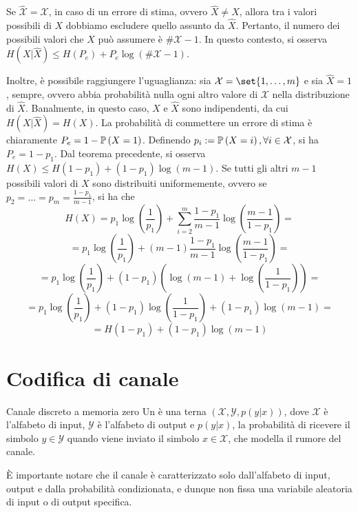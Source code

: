 \begin{observation}{}
  Se \(\mathcal{\hat{X}} = \mathcal{X}\), in caso di un errore di stima, ovvero $\hat{X}\neq X$, allora tra i valori possibili di $X$ dobbiamo escludere quello assunto da $\hat{X}$. Pertanto, il numero dei possibili valori che $X$ può assumere è \(\#\mathcal{X}-1\). In questo contesto, si osserva \(H(X|\hat{X})\leq H(P_e)+P_e\log(\#\mathcal{X}-1)\).

  Inoltre, è possibile raggiungere l'uguaglianza: sia \(\mathcal{X} = \set{1,\ldots,m}\) e sia \(\hat{X} = 1\), sempre, ovvero abbia probabilità nulla ogni altro valore di \(\mathcal{X}\) nella distribuzione di \(\hat{X}\).
  Banalmente, in questo caso, \(X\) e \(\hat{X}\) sono indipendenti, da cui \(H(X|\hat{X}) = H(X)\). La probabilità di commettere un errore di stima è chiaramente $P_e=1-\Prob[X=1]$. Definendo $p_i:=\Prob[X=i], \forall i \in \mathcal{X}$, si ha $P_e=1-p_1$. Dal teorema precedente, si osserva \(H(X) \leq H(1-p_1)+(1-p_1)\log(m-1)\).
  Se tutti gli altri $m-1$ possibili valori di $X$ sono distribuiti uniformemente, ovvero se \(p_2=\ldots=p_m = \frac{1-p_1}{m-1}\), si ha che
  \[H(X) = p_1\log\left(\frac{1}{p_1}\right) + \sum_{i=2}^m \frac{1-p_1}{m-1}\log\left(\frac{m-1}{1-p_1}\right)=\]
  \[ = p_1\log\left(\frac{1}{p_1}\right) + (m-1)\frac{1-p_1}{m-1}\log\left(\frac{m-1}{1-p_1}\right) = \]
  \[ = p_1\log\left(\frac{1}{p_1}\right) + (1-p_1)\left(\log(m-1) + \log\left(\frac{1}{1-p_1}\right)\right) = \]
  \[ = p_1\log\left(\frac{1}{p_1}\right) +(1-p_1)\log\left(\frac{1}{1-p_1}\right) +(1-p_1)\log(m-1) =\]
  \[= H(1-p_1) + (1-p_1)\log(m-1)\]
\end{observation}

\section{Codifica di canale}

\begin{definition}{Canale discreto a memoria zero}
  Un  è una terna \((\mathcal{X}, \mathcal{Y}, p(y|x))\), dove \(\mathcal{X}\) è l'alfabeto di input, \(\mathcal{Y}\) è l'alfabeto di output e \(p(y|x)\), la probabilità di ricevere il simbolo \(y\in\mathcal{Y}\) quando viene inviato il simbolo \(x\in\mathcal{X}\), che modella il rumore del canale.
\end{definition}

È importante notare che il canale è caratterizzato solo dall'alfabeto di input, output e dalla probabilità condizionata, e dunque non fissa una variabile aleatoria di input o di output specifica.

